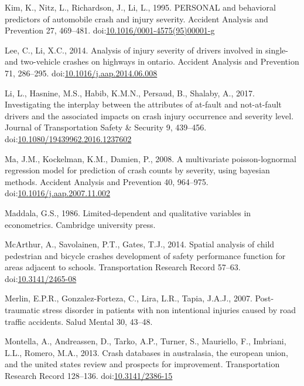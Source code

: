 \documentclass[]{elsarticle} %
\begin{document}
\leavevmode\hypertarget{ref-Kim1995personal}{}%
Kim, K., Nitz, L., Richardson, J., Li, L., 1995. PERSONAL and behavioral
predictors of automobile crash and injury severity. Accident Analysis
and Prevention 27, 469--481.
doi:\href{https://doi.org/10.1016/0001-4575(95)00001-g}{10.1016/0001-4575(95)00001-g}

\leavevmode\hypertarget{ref-Lee2014analysis}{}%
Lee, C., Li, X.C., 2014. Analysis of injury severity of drivers involved
in single- and two-vehicle crashes on highways in ontario. Accident
Analysis and Prevention 71, 286--295.
doi:\href{https://doi.org/10.1016/j.aap.2014.06.008}{10.1016/j.aap.2014.06.008}

\leavevmode\hypertarget{ref-Li2017interplay}{}%
Li, L., Hasnine, M.S., Habib, K.M.N., Persaud, B., Shalaby, A., 2017.
Investigating the interplay between the attributes of at-fault and
not-at-fault drivers and the associated impacts on crash injury
occurrence and severity level. Journal of Transportation Safety \&
Security 9, 439--456.
doi:\href{https://doi.org/10.1080/19439962.2016.1237602}{10.1080/19439962.2016.1237602}

\leavevmode\hypertarget{ref-Ma2008multivariate}{}%
Ma, J.M., Kockelman, K.M., Damien, P., 2008. A multivariate
poisson-lognormal regression model for prediction of crash counts by
severity, using bayesian methods. Accident Analysis and Prevention 40,
964--975.
doi:\href{https://doi.org/10.1016/j.aap.2007.11.002}{10.1016/j.aap.2007.11.002}

\leavevmode\hypertarget{ref-Maddala1986limited}{}%
Maddala, G.S., 1986. Limited-dependent and qualitative variables in
econometrics. Cambridge university press.

\leavevmode\hypertarget{ref-McArthur2014spatial}{}%
McArthur, A., Savolainen, P.T., Gates, T.J., 2014. Spatial analysis of
child pedestrian and bicycle crashes development of safety performance
function for areas adjacent to schools. Transportation Research Record
57--63. doi:\href{https://doi.org/10.3141/2465-08}{10.3141/2465-08}

\leavevmode\hypertarget{ref-Merlin2007stress}{}%
Merlin, E.P.R., Gonzalez-Forteza, C., Lira, L.R., Tapia, J.A.J., 2007.
Post-traumatic stress disorder in patients with non intentional injuries
caused by road traffic accidents. Salud Mental 30, 43--48.

\leavevmode\hypertarget{ref-Montella2013crash}{}%
Montella, A., Andreassen, D., Tarko, A.P., Turner, S., Mauriello, F.,
Imbriani, L.L., Romero, M.A., 2013. Crash databases in australasia, the
european union, and the united states review and prospects for
improvement. Transportation Research Record 128--136.
doi:\href{https://doi.org/10.3141/2386-15}{10.3141/2386-15}
\end{document}

